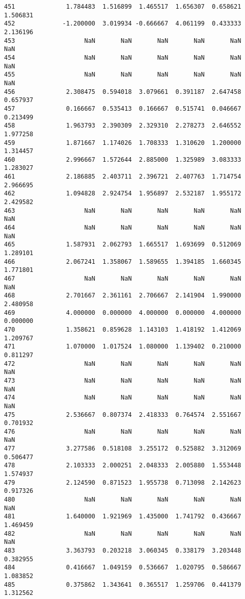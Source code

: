 \documentclass[11pt]{article}
\begin{document}
\begin{Verbatim}[commandchars=\\\{\}]
451              1.784483  1.516899  1.465517  1.656307  0.658621  1.506831
452             -1.200000  3.019934 -0.666667  4.061199  0.433333  2.136196
453                   NaN       NaN       NaN       NaN       NaN       NaN
454                   NaN       NaN       NaN       NaN       NaN       NaN
455                   NaN       NaN       NaN       NaN       NaN       NaN
456              2.308475  0.594018  3.079661  0.391187  2.647458  0.657937
457              0.166667  0.535413  0.166667  0.515741  0.046667  0.213499
458              1.963793  2.390309  2.329310  2.278273  2.646552  1.977258
459              1.871667  1.174026  1.708333  1.310620  1.200000  1.314457
460              2.996667  1.572644  2.885000  1.325989  3.083333  1.283027
461              2.186885  2.403711  2.396721  2.407763  1.714754  2.966695
462              1.094828  2.924754  1.956897  2.532187  1.955172  2.429582
463                   NaN       NaN       NaN       NaN       NaN       NaN
464                   NaN       NaN       NaN       NaN       NaN       NaN
465              1.587931  2.062793  1.665517  1.693699  0.512069  1.289101
466              2.067241  1.358067  1.589655  1.394185  1.660345  1.771801
467                   NaN       NaN       NaN       NaN       NaN       NaN
468              2.701667  2.361161  2.706667  2.141904  1.990000  2.480958
469              4.000000  0.000000  4.000000  0.000000  4.000000  0.000000
470              1.358621  0.859628  1.143103  1.418192  1.412069  1.209767
471              1.070000  1.017524  1.080000  1.139402  0.210000  0.811297
472                   NaN       NaN       NaN       NaN       NaN       NaN
473                   NaN       NaN       NaN       NaN       NaN       NaN
474                   NaN       NaN       NaN       NaN       NaN       NaN
475              2.536667  0.807374  2.418333  0.764574  2.551667  0.701932
476                   NaN       NaN       NaN       NaN       NaN       NaN
477              3.277586  0.518108  3.255172  0.525882  3.312069  0.506477
478              2.103333  2.000251  2.048333  2.005880  1.553448  1.574937
479              2.124590  0.871523  1.955738  0.713098  2.142623  0.917326
480                   NaN       NaN       NaN       NaN       NaN       NaN
481              1.640000  1.921969  1.435000  1.741792  0.436667  1.469459
482                   NaN       NaN       NaN       NaN       NaN       NaN
483              3.363793  0.203218  3.060345  0.338179  3.203448  0.382955
484              0.416667  1.049159  0.536667  1.020795  0.586667  1.083852
485              0.375862  1.343641  0.365517  1.259706  0.441379  1.312562

\end{Verbatim}
\end{document}

